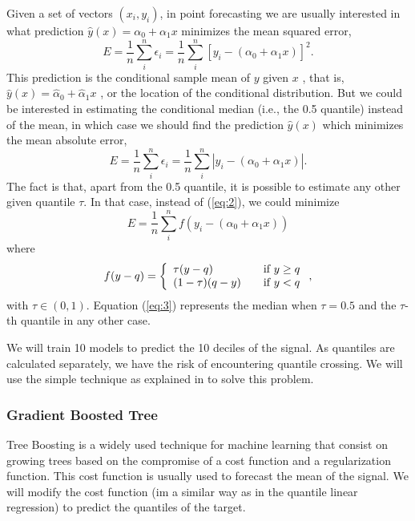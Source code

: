 \documentclass[a4paper,twocolumn,5p]{elsarticle}
\begin{document}
Given a 
set of vectors $(x_i, y_i)$, in point forecasting we are usually 
interested in what prediction $\hat y(x) = \alpha_0 + \alpha_1 x$
minimizes the mean squared error,
\begin{equation}
  \label{eq:1}
  E = \frac{1}{n} \sum^n_i \epsilon_i =
  \frac{1}{n} \sum^n_i [ y_i - (\alpha_0 + \alpha_1 x) ]^2.
\end{equation}
This prediction is the conditional sample mean of $y$ given $x$ , that
 is, $\hat y(x) = \hat\alpha_0 + \hat\alpha_1 x$
, or the location of the conditional distribution. But we could be
interested in estimating the conditional median (i.e., the 0.5
quantile) instead of the mean, in which case we should find the
prediction $\hat y(x)$ which minimizes the mean absolute error,
\begin{equation}
  \label{eq:2}
  E = \frac{1}{n} \sum^n_i \epsilon_i =
  \frac{1}{n} \sum^n_i | y_i - (\alpha_0 + \alpha_1 x) |.
\end{equation}
The fact is that, apart from the 0.5 quantile, it is possible to
estimate any other given quantile $\tau$. In that case, instead of
(\ref{eq:2}), we could minimize
\begin{equation}
  \label{eq:3}
E= \frac{1}{n} \sum^n_i f( y_i - (\alpha_0 + \alpha_1 x))
\end{equation}
where
\begin{equation}
  \label{eq:4}
  f(y-q) = \left\{ 
\begin{array}{l l}
\tau (y-q) & \quad \mbox{if $y \ge q$}\\
(1-\tau) (q-y) & \quad \mbox{if $y < q$}\\
\end{array} \right.,
\end{equation}
with $\tau \in (0,1)$. Equation (\ref{eq:3}) represents the
median when $\tau=0.5$ and the $\tau$-th quantile in any other case.

We will train 10 models to predict the 10 deciles of the signal. As quantiles are 
calculated separately, we have the risk of encountering quantile crossing.
We will use the simple technique as explained in \cite{cross} to solve this problem.

\subsubsection{Gradient Boosted Tree}

Tree Boosting \cite{gradientboost} is a widely used technique for machine learning 
that consist on growing trees based on the compromise 
of a cost function and a regularization function. This cost function is usually 
used to forecast 
the mean of the signal. We will modify the cost function (im a similar way as in 
the quantile linear regression) to predict the quantiles of the target. 
\end{document}
